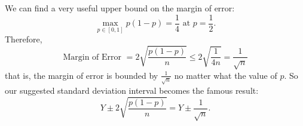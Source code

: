 \documentclass[10pt, a4paper]{article}
\begin{document}
We can find a very useful upper bound on the margin of error:
\[
\max_{p \in [0, 1]}p(1 - p) = \frac{1}{4}\text{ at } p = \frac{1}{2}.
\]
Therefore,
\[
\text{Margin of Error } = 2\sqrt{\frac{p(1 - p)}{n}} \leq 2\sqrt{\frac{1}{4n}} = \frac{1}{\sqrt{n}}
\]
that is,
the margin of error is bounded by $\frac{1}{\sqrt{n}}$ no matter what the value of $p$.
So our suggested standard deviation interval becomes the famous result:
\[
Y \pm 2\sqrt{\frac{p(1 - p)}{n}} = Y \pm \frac{1}{\sqrt{n}}.
\]
\end{document}
